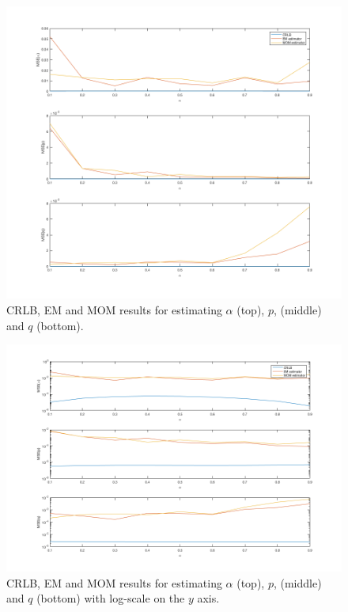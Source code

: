 \begin{figure}[!htbp]
	\centering
	\includegraphics[width=\columnwidth]{images/CRLB_EM_MOM.png}
	\caption{CRLB, EM and MOM results for estimating $\alpha$ (top), $p$, (middle) and $q$ (bottom).}
	\label{figure:crlb-em-mom}
\end{figure}

\begin{figure}[!htbp]
	\centering
	\includegraphics[width=\columnwidth]{images/CRLB_EM_MOM_log.png}
	\caption{CRLB, EM and MOM results for estimating $\alpha$ (top), $p$, (middle) and $q$ (bottom) with log-scale on the $y$ axis.}
	\label{figure:crlb-em-mom-logscale}
\end{figure}

